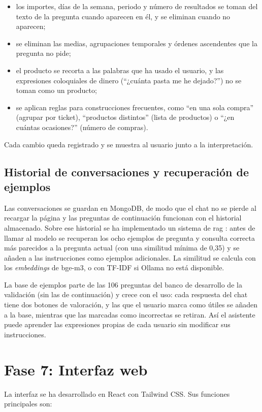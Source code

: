 \begin{itemize}
    \item los importes, días de la semana, periodo y número de resultados se toman del texto de la pregunta cuando aparecen en él, y se eliminan cuando no aparecen;
    \item se eliminan las medias, agrupaciones temporales y órdenes ascendentes que la pregunta no pide;
    \item el producto se recorta a las palabras que ha usado el usuario, y las expresiones coloquiales de dinero (\enquote{¿cuánta pasta me he dejado?}) no se toman como un producto;
    \item se aplican reglas para construcciones frecuentes, como \enquote{en una sola compra} (agrupar por ticket), \enquote{productos distintos} (lista de productos) o \enquote{¿en cuántas ocasiones?} (número de compras).
\end{itemize}

Cada cambio queda registrado y se muestra al usuario junto a la interpretación.

\subsection{Historial de conversaciones y recuperación de ejemplos}
\label{s:rag}
Las conversaciones se guardan en MongoDB, de modo que el chat no se pierde al recargar la página y las preguntas de continuación funcionan con el historial almacenado. Sobre ese historial se ha implementado un sistema de \gls{rag} \parencite{lewis2020rag}: antes de llamar al modelo se recuperan los ocho ejemplos de pregunta y consulta correcta más parecidos a la pregunta actual (con una similitud mínima de 0,35) y se añaden a las instrucciones como ejemplos adicionales. La similitud se calcula con los \textit{embeddings} de bge-m3, o con TF-IDF si Ollama no está disponible.

La base de ejemplos parte de las 106 preguntas del banco de desarrollo de la validación (sin las de continuación) y crece con el uso: cada respuesta del chat tiene dos botones de valoración, y las que el usuario marca como útiles se añaden a la base, mientras que las marcadas como incorrectas se retiran. Así el asistente puede aprender las expresiones propias de cada usuario sin modificar sus instrucciones.

\section{Fase 7: Interfaz web}
\label{s:interfaz}
La interfaz se ha desarrollado en React con Tailwind CSS. Sus funciones principales son:

